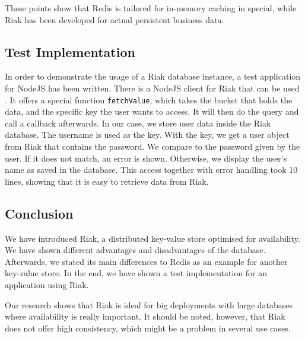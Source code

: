 These points show that Redis is tailored for in-memory caching in special, while Riak has been developed for actual persistent business data. 

\subsection{Test Implementation}
In order to demonstrate the usage of a Riak database instance, a test application for NodeJS has been written. There is a NodeJS client for Riak that can be used \parencite{RiakNodeJsClient}. It offers a special function \texttt{fetchValue}, which takes the bucket that holds the data, and the specific key the user wants to access. It will then do the query and call a callback afterwards. In our case, we store user data inside the Riak database. The username is used as the key. With the key, we get a user object from Riak that contains the password. We compare to the password given by the user. If it does not match, an error is shown. Otherwise, we display the user's name as saved in the database. This access together with error handling took 10 lines, showing that it is easy to retrieve data from Riak.

\subsection{Conclusion}
We have introduced Riak, a distributed key-value store optimised for availability. We have shown different advantages and disadvantages of the database. Afterwards, we stated its main differences to Redis as an example for another key-value store. In the end, we have shown a test implementation for an application using Riak.

Our research shows that Riak is ideal for big deployments with large databases where availability is really important. It should be noted, however, that Riak does not offer high consistency, which might be a problem in several use cases.